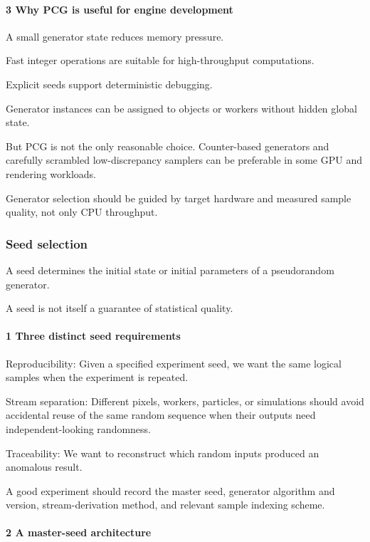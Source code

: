 \paragraph{3 Why PCG is useful for engine development}\label{why-pcg-is-useful-for-engine-development}

A small generator state reduces memory pressure.

Fast integer operations are suitable for high-throughput computations.

Explicit seeds support deterministic debugging.

Generator instances can be assigned to objects or workers without hidden global state.

But PCG is not the only reasonable choice. Counter-based generators and carefully scrambled low-discrepancy samplers can be preferable in some GPU and rendering workloads.

Generator selection should be guided by target hardware and measured sample quality, not only CPU throughput.

\subsubsection{Seed selection}\label{seed-selection}

A seed determines the initial state or initial parameters of a pseudorandom generator.

A seed is not itself a guarantee of statistical quality.

\paragraph{1 Three distinct seed requirements}\label{three-distinct-seed-requirements}

Reproducibility: Given a specified experiment seed, we want the same logical samples when the experiment is repeated.

Stream separation: Different pixels, workers, particles, or simulations should avoid accidental reuse of the same random sequence when their outputs need independent-looking randomness.

Traceability: We want to reconstruct which random inputs produced an anomalous result.

A good experiment should record the master seed, generator algorithm and version, stream-derivation method, and relevant sample indexing scheme.

\paragraph{2 A master-seed architecture}\label{a-master-seed-architecture}

